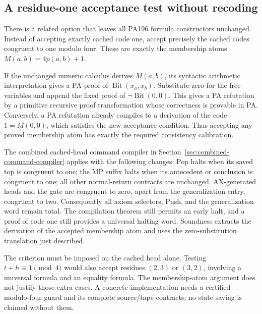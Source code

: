 \subsection{A residue-one acceptance test without recoding}
\label{sec:membership-acceptance}

There is a related option that leaves all PA196 formula constructors
unchanged.  Instead of accepting exactly cached code one, accept precisely
the cached codes congruent to one modulo four.  These are exactly the
membership atoms $M(a,b)=4p(a,b)+1$.

If the unchanged numeric calculus derives $M(a,b)$, its syntactic arithmetic
interpretation gives a PA proof of $\operatorname{Bit}(x_a,x_b)$.  Substitute
zero for the free variables and append the fixed proof of
$\neg\operatorname{Bit}(0,0)$.  This gives a PA refutation by a primitive
recursive proof transformation whose correctness is provable in PA.
Conversely, a PA refutation already compiles to a derivation of the code
$1=M(0,0)$, which satisfies the new acceptance condition.  Thus accepting
any proved membership atom has exactly the required consistency calibration.

The combined cached-head command compiler in
Section~\ref{sec:combined-command-compiler} applies with the following
changes: Pop halts when its saved top is congruent to one; the MP suffix
halts when its antecedent or conclusion is congruent to one; all other
normal-return contracts are unchanged.  AX-generated heads and the gate
are congruent to zero, apart from the generalization entry, congruent to two.
Consequently all axiom selectors, Push, and the generalization word remain
total.  The compilation theorem still permits an early halt, and a proof of
code one still provides a universal halting word.  Soundness extracts the
derivation of the accepted membership atom and uses the zero-substitution
translation just described.

The criterion must be imposed on the cached head alone.  Testing
$t+h\equiv1\pmod4$ would also accept residues $(2,3)$ or $(3,2)$, involving
a universal formula and an equality formula.  The membership-atom argument
does not justify those extra cases.  A concrete implementation needs a
certified modulo-four guard and its complete source/tape contracts; no
state saving is claimed without them.
